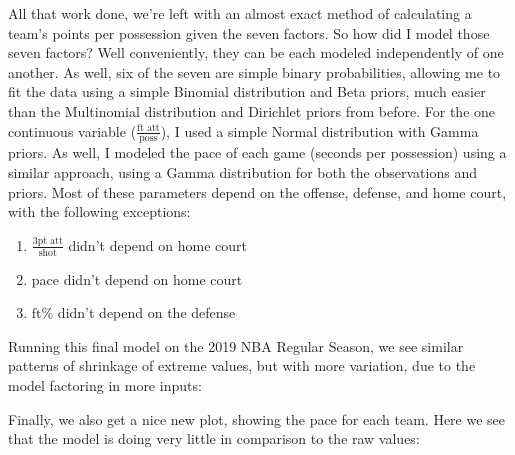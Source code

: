 \documentclass[12 pt]{article}
\begin{document}
\begin{flushleft}
All that work done, we're left with an almost exact method of calculating a team's points per possession given the seven factors.
So how did I model those seven factors?
Well conveniently, they can be each modeled independently of one another.
As well, six of the seven are simple binary probabilities, allowing me to fit the data using a simple Binomial distribution and Beta priors, much easier than the Multinomial distribution and Dirichlet priors from before.
For the one continuous variable ($ \frac{\text{ft att}}{\text{poss}} $), I used a simple Normal distribution with Gamma priors.
As well, I modeled the pace of each game (seconds per possession) using a similar approach, using a Gamma distribution for both the observations and priors.
Most of these parameters depend on the offense, defense, and home court, with the following exceptions:
\begin{enumerate}
    \item{$ \frac{\text{3pt att}}{\text{shot}} $ didn't depend on home court}
    \item{pace didn't depend on home court}
    \item{$ \text{ft}\% $ didn't depend on the defense}
\end{enumerate}

Running this final model on the 2019 NBA Regular Season, we see similar patterns of shrinkage of extreme values, but with more variation, due to the model factoring in more inputs:

Finally, we also get a nice new plot, showing the pace for each team. Here we see that the model is doing very little in comparison to the raw values:

\end{flushleft}
\end{document}
